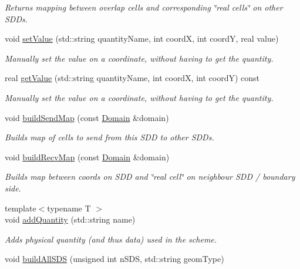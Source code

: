 \begin{DoxyCompactItemize}
\begin{DoxyCompactList}\small\item\em Returns mapping between overlap cells and corresponding \char`\"{}real cells\char`\"{} on other S\+D\+Ds. \end{DoxyCompactList}\item 
void \hyperlink{classSDDistributed_ae9d8db949ba9da0a95407e1066df17b9}{set\+Value} (std\+::string quantity\+Name, int coordX, int coordY, real value)
\begin{DoxyCompactList}\small\item\em Manually set the value on a coordinate, without having to get the quantity. \end{DoxyCompactList}\item 
real \hyperlink{classSDDistributed_a1db6a1bf2f8781b9e4b12be99b4bf9c4}{get\+Value} (std\+::string quantity\+Name, int coordX, int coordY) const
\begin{DoxyCompactList}\small\item\em Manually set the value on a coordinate, without having to get the quantity. \end{DoxyCompactList}\item 
void \hyperlink{classSDDistributed_ae7695b6c9096e7a2f9c5fc16174aaae9}{build\+Send\+Map} (const \hyperlink{classDomain}{Domain} \&domain)
\begin{DoxyCompactList}\small\item\em Builds map of cells to send from this S\+DD to other S\+D\+Ds. \end{DoxyCompactList}\item 
void \hyperlink{classSDDistributed_af819b64d742bec7dee4fd0fab43aa6e5}{build\+Recv\+Map} (const \hyperlink{classDomain}{Domain} \&domain)
\begin{DoxyCompactList}\small\item\em Builds map between coords on S\+DD and \char`\"{}real cell\char`\"{} on neighbour S\+DD / boundary side. \end{DoxyCompactList}\item 
{\footnotesize template$<$typename T $>$ }\\void \hyperlink{classSDDistributed_a82b5a390e964051d1952c683b4fa5f05}{add\+Quantity} (std\+::string name)
\begin{DoxyCompactList}\small\item\em Adds physical quantity (and thus data) used in the scheme. \end{DoxyCompactList}\item 
void \hyperlink{classSDDistributed_a3dbacea02c2d4f36310c81f87f90fe5a}{build\+All\+S\+DS} (unsigned int n\+S\+DS, std\+::string geom\+Type)

\end{DoxyCompactItemize}

